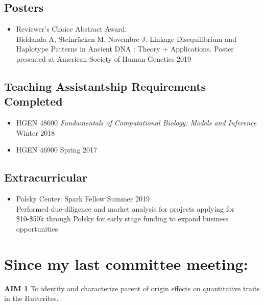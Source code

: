 \documentclass[a4paper, 11pt]{article}
\begin{document}
\subsection*{Posters}
\begin{itemize}
	 \item Reviewer's Choice Abstract Award: \\Biddanda A, Steinr\"{u}cken M, Novembre J. Linkage Disequilibrium and Haplotype Patterns in Ancient DNA : Theory + Applications. Poster presented at American Society of Human Genetics 2019
\end{itemize}

\subsection*{Teaching Assistantship Requirements Completed}
\begin{itemize}
	\item HGEN 48600 \emph{Fundamentals of Computational Biology: Models and Inference} \hfill Winter 2018\\
	\item HGEN 46900 \emph{} \hfill Spring 2017\\
\end{itemize}

\subsection*{Extracurricular}
\begin{itemize}
	\item  Polsky Center: Spark Fellow \hfill Summer 2019 \\
		Performed due-diligence and market analysis for projects applying for \$10-\$50k through Polsky for early stage funding to expand business opportunities  
\end{itemize}


\newpage

\section*{Since my last committee meeting:} %
\textbf{AIM 1} To identify and characterize parent of origin effects on quantitative traits in the Hutterites. \\
\end{document}
